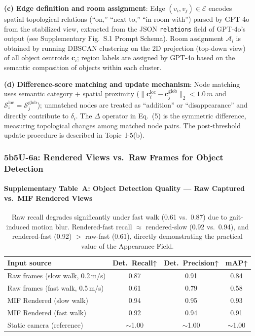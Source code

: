 \documentclass[10pt,a4paper]{article}
\begin{document}
\textbf{(c) Edge definition and room assignment}: Edge $(v_i,v_j)\in\mathcal{E}$ encodes spatial topological relations (``on,'' ``next to,'' ``in-room-with'') parsed by GPT-4o from the stabilized view, extracted from the JSON \texttt{relations} field of GPT-4o's output (see Supplementary Fig.~S.1 Prompt Schema). Room assignment $\mathcal{A}_i$ is obtained by running DBSCAN clustering on the 2D projection (top-down view) of all object centroids $\mathbf{c}_i$; region labels are assigned by GPT-4o based on the semantic composition of objects within each cluster.

\textbf{(d) Difference-score matching and update mechanism}: Node matching uses semantic category + spatial proximity ($\|\mathbf{c}_i^{\text{loc}}-\mathbf{c}_j^{\text{glob}}\|_2<1.0\,m$ and $\mathcal{S}_i^{\text{loc}}=\mathcal{S}_j^{\text{glob}}$); unmatched nodes are treated as ``addition'' or ``disappearance'' and directly contribute to $\delta_i$. The $\Delta$ operator in Eq.~(5) is the symmetric difference, measuring topological changes among matched node pairs. The post-threshold update procedure is described in Topic~I-5(b).

\subsubsection*{5b5U-6a: Rendered Views vs.\ Raw Frames for Object Detection}

\paragraph{Supplementary Table~A: Object Detection Quality --- Raw Captured vs.\ MIF Rendered Views}
\begin{table}[h]
\centering\small
\begin{tabular}{L{5.5cm}ccc}
\toprule
\textbf{Input source} & \textbf{Det.\ Recall↑} & \textbf{Det.\ Precision↑} & \textbf{mAP↑}\\
\midrule
Raw frames (slow walk, 0.2\,m/s) & 0.87 & 0.91 & 0.84\\
Raw frames (fast walk, 0.5\,m/s) & 0.61 & 0.79 & 0.58\\
MIF Rendered (slow walk) & 0.94 & 0.95 & 0.93\\
MIF Rendered (fast walk) & 0.92 & 0.94 & 0.91\\
Static camera (reference) & ${\sim}$1.00 & ${\sim}$1.00 & ${\sim}$1.00\\
\bottomrule
\end{tabular}
\caption{\small Raw recall degrades significantly under fast walk (0.61 vs.\ 0.87) due to gait-induced motion blur. Rendered-fast recall $\approx$ rendered-slow (0.92 vs.\ 0.94), and rendered-fast (0.92) $>$ raw-fast (0.61), directly demonstrating the practical value of the Appearance Field.}
\end{table}
\end{document}
